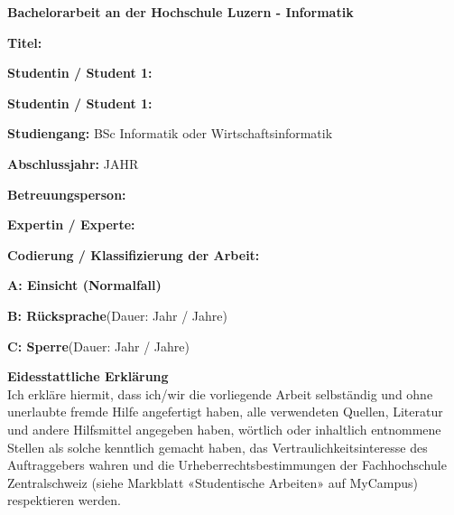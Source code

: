 \vspace*{1.35cm}

\noindent
\textbf{\Large{Bachelorarbeit an der Hochschule Luzern - Informatik}}

\vspace{0.6cm}
\noindent
\textbf{Titel:}

\vspace{0.6cm}
\noindent
\textbf{Studentin / Student 1:}

\vspace{0.6cm}
\noindent
\textbf{Studentin / Student 1:}

\vspace{1cm}
\noindent
\textbf{Studiengang:} BSc Informatik oder Wirtschaftsinformatik

\vspace{0.6cm}
\noindent
\textbf{Abschlussjahr:} JAHR

\vspace{0.6cm}
\noindent
\textbf{Betreuungsperson:}

\vspace{0.6cm}
\noindent
\textbf{Expertin / Experte:}

\vspace{0.6cm}
\noindent
\textbf{Codierung / Klassifizierung der Arbeit:}

\begin{todolist}
	\item \textbf{A: Einsicht (Normalfall)}
	\item \textbf{B: Rücksprache}\hspace*{0.7cm}(Dauer:\hspace*{1cm} Jahr / Jahre)
	\item \textbf{C: Sperre}\hspace*{1.865cm}(Dauer:\hspace*{1cm} Jahr / Jahre)
\end{todolist}

\vfill

\noindent
\textbf{Eidesstattliche Erklärung}
\\
Ich erkläre hiermit, dass ich/wir die vorliegende Arbeit selbständig und ohne unerlaubte fremde Hilfe angefertigt haben, alle verwendeten Quellen, Literatur und andere Hilfsmittel angegeben haben, wörtlich oder inhaltlich entnommene Stellen als solche kenntlich gemacht haben, das Vertraulichkeitsinteresse des Auftraggebers wahren und die Urheberrechtsbestimmungen der Fachhochschule Zentralschweiz (siehe Markblatt «Studentische Arbeiten» auf MyCampus) respektieren werden.

